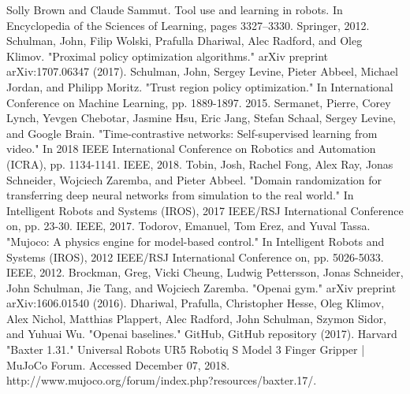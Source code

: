 \documentclass[conference]{IEEEtran}
\begin{document}
\begin{thebibliography}{00}
 Solly Brown and Claude Sammut. Tool use and learning in robots. In Encyclopedia of the Sciences of Learning, pages 3327–3330. Springer, 2012.
 Schulman, John, Filip Wolski, Prafulla Dhariwal, Alec Radford, and Oleg Klimov. "Proximal policy optimization algorithms." arXiv preprint arXiv:1707.06347 (2017).
 Schulman, John, Sergey Levine, Pieter Abbeel, Michael Jordan, and Philipp Moritz. "Trust region policy optimization." In International Conference on Machine Learning, pp. 1889-1897. 2015.
 Sermanet, Pierre, Corey Lynch, Yevgen Chebotar, Jasmine Hsu, Eric Jang, Stefan Schaal, Sergey Levine, and Google Brain. "Time-contrastive networks: Self-supervised learning from video." In 2018 IEEE International Conference on Robotics and Automation (ICRA), pp. 1134-1141. IEEE, 2018.
 Tobin, Josh, Rachel Fong, Alex Ray, Jonas Schneider, Wojciech Zaremba, and Pieter Abbeel. "Domain randomization for transferring deep neural networks from simulation to the real world." In Intelligent Robots and Systems (IROS), 2017 IEEE/RSJ International Conference on, pp. 23-30. IEEE, 2017.
 Todorov, Emanuel, Tom Erez, and Yuval Tassa. "Mujoco: A physics engine for model-based control." In Intelligent Robots and Systems (IROS), 2012 IEEE/RSJ International Conference on, pp. 5026-5033. IEEE, 2012.
 Brockman, Greg, Vicki Cheung, Ludwig Pettersson, Jonas Schneider, John Schulman, Jie Tang, and Wojciech Zaremba. "Openai gym." arXiv preprint arXiv:1606.01540 (2016).
 Dhariwal, Prafulla, Christopher Hesse, Oleg Klimov, Alex Nichol, Matthias Plappert, Alec Radford, John Schulman, Szymon Sidor, and Yuhuai Wu. "Openai baselines." GitHub, GitHub repository (2017).
Harvard	
 "Baxter 1.31." Universal Robots UR5 Robotiq S Model 3 Finger Gripper | MuJoCo Forum. Accessed December 07, 2018. http://www.mujoco.org/forum/index.php?resources/baxter.17/.

\end{thebibliography}
\end{document}
